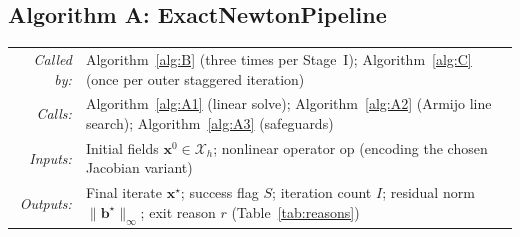 \documentclass{article}
\makeatletter
\newcommand{\moduleinterface}[4]{%
\begin{interfacecard}
\footnotesize
\begin{tabular}{@{}r@{\quad}p{0.82\textwidth}@{}}
\textit{Called by:} & #1 \\
\textit{Calls:}     & #2 \\
\textit{Inputs:}    & #3 \\
\textit{Outputs:}   & #4 \\
\end{tabular}
\end{interfacecard}
}
\makeatother
\begin{document}
\subsection{Algorithm A: ExactNewtonPipeline}

\moduleinterface
    {Algorithm~\ref{alg:B} (three times per Stage~I); Algorithm~\ref{alg:C} (once per outer staggered iteration)}
    {Algorithm~\ref{alg:A1} (linear solve); Algorithm~\ref{alg:A2} (Armijo line search); Algorithm~\ref{alg:A3} (safeguards)}
    {Initial fields $\boldsymbol{x}^0 \in \mathcal{X}_h$; nonlinear operator $\mathrm{op}$ (encoding the chosen Jacobian variant)}
    {Final iterate $\boldsymbol{x}^\star$; success flag $S$; iteration count $I$; residual norm $\|\boldsymbol{b}^\star\|_\infty$; exit reason $r$ (Table~\ref{tab:reasons})}
\end{document}
